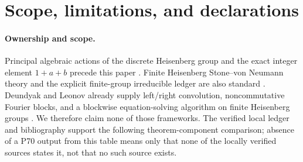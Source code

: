 \section{Scope, limitations, and declarations}

\paragraph{Ownership and scope.}
Principal algebraic actions of the discrete Heisenberg group and the exact
integer element $1+a+b$ precede this paper
\citep{GollSchmidtVerbitskiy2014,LindSchmidt2015}.  Finite Heisenberg
Stone--von Neumann theory and the explicit finite-group irreducible ledger are
also standard \citep{GurevichHadani2010,GrassbergerHormann2001}.  Deundyak and
Leonov already supply left/right convolution, noncommutative Fourier blocks,
and a blockwise equation-solving algorithm on finite Heisenberg groups
\citep{DeundyakLeonov2016}.  We therefore claim none of those frameworks.
The verified local ledger and bibliography support the following
theorem-component comparison; absence of a P70 output from this table means
only that none of the locally verified sources states it, not that no such
source exists.

